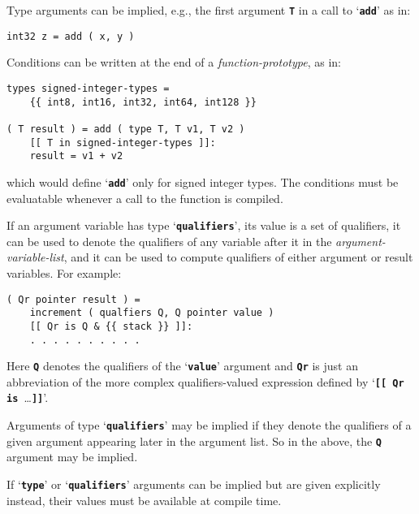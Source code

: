 \documentclass[12pt]{article}
\newcommand{\TT}[1]{{\tt \bfseries #1}}
\newenvironment{indpar}[1][0.3in]%
	{\begin{list}{}%
		     {\setlength{\itemsep}{0in}%
		      \setlength{\topsep}{0in}%
		      \setlength{\parsep}{1ex}%
		      \setlength{\labelwidth}{#1}%
		      \setlength{\leftmargin}{#1}%
		      \addtolength{\leftmargin}{\labelsep}}%
	 \item}%
	{\end{list}}
\begin{document}
Type arguments can be implied, e.g., the first argument \TT{T}
in a call to `\TT{add}' as in:

\begin{indpar}\begin{verbatim}
int32 z = add ( x, y )
\end{verbatim}\end{indpar}

Conditions can be written at the end of a {\em function-prototype},
as in:
\begin{indpar}\begin{verbatim}
types signed-integer-types =
    {{ int8, int16, int32, int64, int128 }}

( T result ) = add ( type T, T v1, T v2 )
    [[ T in signed-integer-types ]]:
    result = v1 + v2
\end{verbatim}\end{indpar}

which would define `\TT{add}' only for signed integer types.
The conditions must be evaluatable whenever a call to the
function is compiled.

If an argument variable has type `\TT{qualifiers}',
its value is a set of qualifiers,
it can be used to denote the qualifiers of any variable
after it in the {\em argument-variable-list}, and it can be
used to compute qualifiers of either argument or result variables.
For example:
\begin{indpar}\begin{verbatim}
( Qr pointer result ) =
    increment ( qualfiers Q, Q pointer value )
    [[ Qr is Q & {{ stack }} ]]:
    . . . . . . . . . .
\end{verbatim}\end{indpar}

Here \TT{Q} denotes the qualifiers of the `\TT{value}' argument
and \TT{Qr} is just an abbreviation of the more complex
qualifiers-valued expression defined by `\TT{[[ Qr is~}\ldots\TT{]]}'.

Arguments of type `\TT{qualifiers}' may be implied if they
denote the qualifiers of a given argument appearing later in the
argument list.  So in the above,
the \TT{Q} argument may be implied.

If `\TT{type}' or `\TT{qualifiers}' arguments can be implied
but are given explicitly instead, their values must be available
at compile time.
\end{document}
